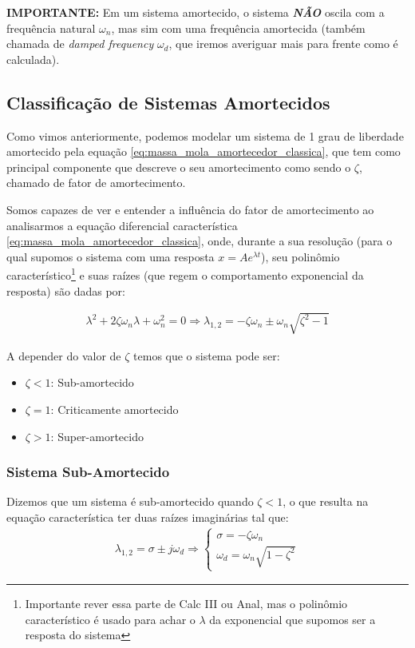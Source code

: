 \documentclass{article}
\begin{document}
                \textbf{IMPORTANTE:} Em um sistema amortecido, o sistema \textbf{\emph{NÃO}} oscila com a frequência natural $\omega_n$, mas sim com uma frequência amortecida (também chamada de
                \emph{damped frequency} $\omega_d$, que iremos averiguar mais para frente como é calculada).
                \newpage

            \subsection{Classificação de Sistemas Amortecidos}
                Como vimos anteriormente, podemos modelar um sistema de 1 grau de liberdade amortecido pela equação \ref{eq:massa_mola_amortecedor_classica}, que tem como principal componente que
                descreve o seu amortecimento como sendo o $\zeta$, chamado de fator de amortecimento.
                
                Somos capazes de ver e entender a influência do fator de amortecimento ao analisarmos a equação diferencial característica \ref{eq:massa_mola_amortecedor_classica}, onde, 
                durante a sua resolução (para o qual supomos o sistema com uma resposta $x=Ae^{\lambda t}$), seu polinômio característico\footnote{Importante rever essa parte de Calc III ou Anal, mas o
                polinômio característico é usado para achar o $\lambda$ da exponencial que supomos ser a resposta do sistema} e suas raízes (que regem o comportamento exponencial da resposta) são dadas por:

                \begin{align*}
                    \lambda^2 + 2\zeta \omega_n \lambda + \omega_n^2 = 0 \Rightarrow
                    \lambda_{1,2} = -\zeta \omega_n \pm \omega_n \sqrt{\zeta^2 - 1}
                \end{align*}

                A depender do valor de $\zeta$ temos que o sistema pode ser:
                \begin{itemize}
                    \item $\zeta < 1$: Sub-amortecido
                    \item $\zeta=1$: Criticamente amortecido
                    \item $\zeta > 1$: Super-amortecido
                \end{itemize}

                \subsubsection{Sistema Sub-Amortecido}
                    Dizemos que um sistema é sub-amortecido quando $\zeta < 1$, o que resulta na equação característica ter duas raízes imaginárias tal que:
                    \begin{align}
                        \lambda_{1,2} = \sigma \pm  j \omega_d \Rightarrow \begin{cases}\sigma = -\zeta \omega_n \\ \omega_d = \omega_n \sqrt{1 - \zeta^2}\end{cases}\label{eq:raizes_caso_sub_amortecido}
                    \end{align}
                    
\end{document}
